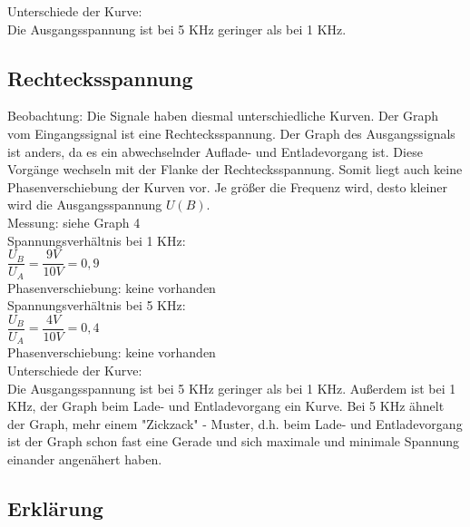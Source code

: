 \documentclass[paper=a4, fontsize=11pt]{scrartcl}
\numberwithin{equation}{section}
\numberwithin{figure}{section}
\numberwithin{table}{section}
\begin{document}
Unterschiede der Kurve: \\

Die Ausgangsspannung ist bei 5 KHz geringer als bei 1 KHz.

\newpage

\subsection{Rechtecksspannung}

Beobachtung: Die Signale haben diesmal unterschiedliche Kurven. Der Graph vom Eingangssignal ist eine Rechtecksspannung. Der Graph des Ausgangssignals ist anders, da es ein abwechselnder Auflade- und Entladevorgang ist. Diese Vorgänge wechseln mit der Flanke der Rechtecksspannung. Somit liegt auch keine Phasenverschiebung der Kurven vor. Je größer die Frequenz wird, desto kleiner wird die Ausgangsspannung $U(B)$. \\

Messung: siehe Graph 4 \\

Spannungsverhältnis bei 1 KHz: \\

$\dfrac{U_{B}}{U_{A}} = \dfrac{9V}{10V} = 0,9$ \\

Phasenverschiebung: keine vorhanden \\

Spannungsverhältnis bei 5 KHz: \\

$\dfrac{U_{B}}{U_{A}} = \dfrac{4V}{10V} = 0,4$ \\

Phasenverschiebung: keine vorhanden \\

Unterschiede der Kurve: \\

Die Ausgangsspannung ist bei 5 KHz geringer als bei 1 KHz. Außerdem ist bei 1 KHz, der Graph beim Lade- und Entladevorgang ein Kurve. Bei 5 KHz ähnelt der Graph, mehr einem "Zickzack" - Muster, d.h. beim Lade- und Entladevorgang ist der Graph schon fast eine Gerade und sich maximale und minimale Spannung einander angenähert haben.

\newpage

\subsection{Erklärung}
\end{document}
